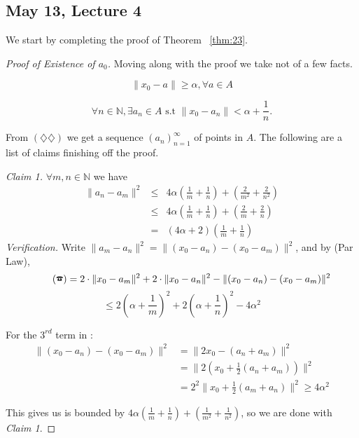 \documentclass[11pt]{amsart}
\theoremstyle{definition}
\numberwithin{equation}{section}
\newcommand{\bN}{ \mathbb{N} }	%
\begin{document}
\vspace{10pt}

\subsection{May 13, Lecture 4} We start by completing the proof of Theorem ~\ref{thm:23}. 

\begin{proof}[Proof of Existence of $a_0$] Moving along with the proof we take not of a few facts. 

\[ \tag{$\diamondsuit$} \| x_0 - a \| \ge \alpha , \forall a \in A \]

\[ \tag{$\diamondsuit \diamondsuit$} \forall n \in \bN, \exists a_n \in A \mbox{ s.t } \| x_0 - a_n \| < \alpha + \frac 1 n. \]

From $( \diamondsuit \diamondsuit)$ we get a sequence $(a_n)_{n = 1}^{\infty}$ of points in $A$. The following are a list of claims finishing off the proof. 

\textit{Claim 1.} $\forall m,n \in \bN$ we have 
\begin{eqnarray}
\| a_n - a_m \| ^2 & \le & 4\alpha \left( \frac 1 m + \frac 1 n \right) + \left( \frac 2 {m^2} + \frac 2 {n^2} \right)  \nonumber \\
			& \le & 4 \alpha \left( \frac 1 m + \frac 1 n \right) + \left( \frac 2 m + \frac 2 n \right) \nonumber  \\
			& = & (4 \alpha + 2) \left( \frac 1 m + \frac 1 n \right) \nonumber 
\end{eqnarray}
\newpage
\textit{Verification.} Write $\|a_m - a_n\|^2 = \|(x_0 - a_n) - (x_0 - a_m)\|^2 $, and by (Par Law), 
\[ \tag{\ding{37}} = 2 \cdot \|x_0 - a_m \|^2 + 2\cdot \| x_0 - a_n \|^2 -  \|(x_0 - a_n) - (x_0 - a_m)\|^2 \]
\[ \le 2 \left( \alpha + \frac 1 m \right)^2 + 2 \left( \alpha +\frac 1 n \right)^2 - 4 \alpha ^2\]

For the $3^{rd}$ term in :
\begin{align*}
  \|(x_0 - a_n) - (x_0 - a_m)\|^2 &= \|2 x_0 - (a_n + a_m) \|^2 \\
  &= \|2 \left(x_0 + \frac 1 2 (a_n + a_m) \right)\|^2	\\
  &= \tag{$\diamondsuit$} 2^2 \|x_0 + \frac 1 2 (a_m + a_n) \|^2 \ge 4 \alpha^2
\end{align*}

This gives us  is bounded by $4 \alpha \left( \frac 1 m +  \frac 1 n \right) + \left( \frac 1 {m^2} +  \frac 1 {n^2} \right)$, so we are done with \textit{Claim 1}. 


\end{proof}
\end{document}
